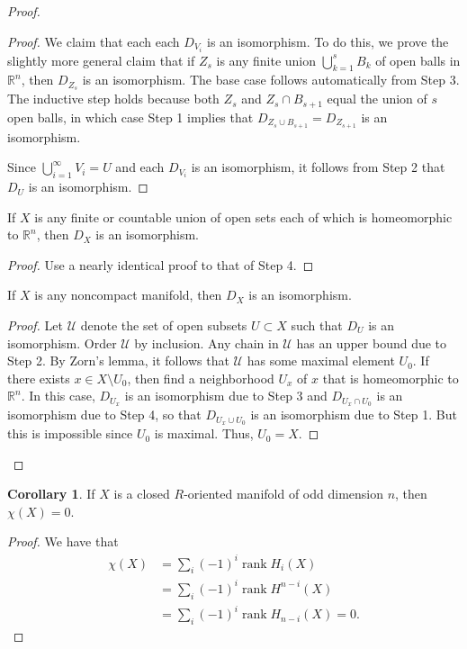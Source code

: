 \documentclass[10pt,letterpaper,cm]{nupset}
\theoremstyle{definition}
\theoremstyle{theorem}
\newtheorem{corollary}[definition]{Corollary}
\theoremstyle{remark}
\newcommand{\R}{\mathbb{R}}
\newcommand{\1}{\mathbb{1}}
\newcommand{\0}{\vec 0}
\DeclareMathOperator{\rnk}{rank}
\begin{document}
\begin{proof}
\begin{steps}
\begin{proof}
We claim that each each $D_{V_i}$ is an isomorphism. To do this, we prove the slightly more general claim that if $Z_s$ is any finite union $\bigcup_{k=1}^s B_k$ of open balls in $\R^n$, then $D_{Z_s}$ is an isomorphism. The base case follows automatically from Step 3. The inductive step holds because both $Z_s$ and $Z_s\cap B_{s+1}$ equal the union of $s$ open balls, in which case Step 1 implies that $ D_{Z_s \cup B_{s+1}} = D_{Z_{s+1}}$ is an isomorphism.

Since $\bigcup_{i=1}^{\infty} V_i = U$ and each $D_{V_i}$ is an isomorphism, it follows from Step 2 that $D_U$ is an isomorphism.
\end{proof}
\item If $X$ is any finite or countable union of open sets each of which is homeomorphic to $\R^n$, then $D_X$ is an isomorphism.
\begin{proof}
Use a nearly identical proof to that of Step 4.
\end{proof}
\item If $X$ is any noncompact manifold, then $D_X$ is an isomorphism.
\begin{proof}
Let $\mathcal{U}$ denote the set of open subsets $U\subset X$ such that $D_U$ is an isomorphism. Order $\mathcal{U}$ by inclusion. Any chain in $\mathcal{U}$  has an upper bound due to Step 2. By Zorn's lemma, it follows that $\mathcal{U}$  has  some maximal element $U_0$. If there exists $x\in X \setminus U_0$, then find a neighborhood $U_x$ of $x$ that is homeomorphic to $\R^n$. In this case, $D_{U_x}$ is an isomorphism due to Step 3 and $D_{U_x \cap U_0}$ is an isomorphism due to Step 4, so that $D_{U_x \cup U_0}$ is an isomorphism due to Step 1. But this is impossible since $U_0$ is maximal. Thus, $U_0 = X$.
\end{proof}
\end{steps}
\end{proof}

\begin{corollary}
If $X$ is a closed $R$-oriented manifold of odd dimension $n$, then $\chi(X) =0$.
\end{corollary}
\begin{proof}
We have that \begin{align*} \chi(X) &= \sum_i({-1})^i\rnk{H_i(X)} \\ & = \sum_i({-1})^i\rnk{H^{n-i}(X)} \\ &= \sum_i({-1})^i\rnk{H_{n-i}(X)} =0.\end{align*}
\end{proof}
\end{document}

